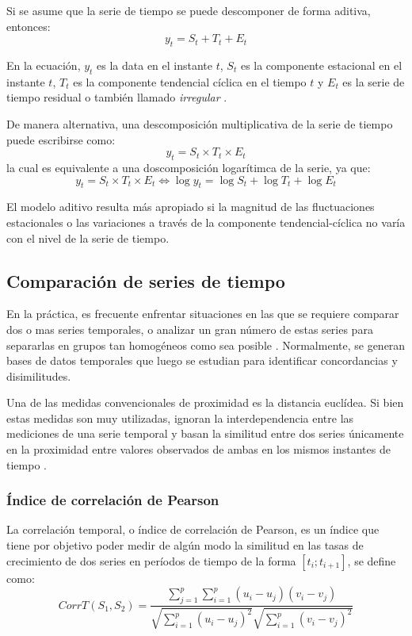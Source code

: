    Si se asume que la serie de tiempo se puede descomponer de forma aditiva, entonces:
    \begin{equation}
        y_t = S_t + T_t + E_t
     \end{equation}
        
     En la ecuación,  $y_t$ es la data en el instante $t$, $S_t$ es la componente estacional en el instante $t$, $T_t$ es la componente tendencial cíclica en el tiempo $t$
     y $E_t$ es la serie de tiempo residual o también llamado \textit{irregular} \cite{20}.

     De manera alternativa, una descomposición multiplicativa de la serie de tiempo puede escribirse como:
     \begin{equation}
        y_t = S_t 
        \times T_t 
        \times E_t
     \end{equation}
     la cual es equivalente a una doscomposición logarítimca de la serie, ya que:
     \begin{equation*}
        y_t = S_t 
        \times T_t 
        \times E_t
        \iff
        \log y_t =  \log S_t +
        \log T_t +
        \log E_t
     \end{equation*}

     El modelo aditivo resulta más apropiado si la magnitud de las fluctuaciones estacionales o las variaciones
     a través de la componente tendencial-cíclica no varía con el nivel de la serie de tiempo.


     \subsection{Comparación de series de tiempo}
     En la práctica, es frecuente enfrentar situaciones
     en las que se requiere comparar dos o mas series temporales, o analizar un gran
     número de estas series para separarlas en grupos tan homogéneos como sea posible \cite{27}.
     Normalmente, se generan bases de datos temporales que luego se estudian para identificar concordancias y disimilitudes.    

     Una de las medidas convencionales de proximidad es la distancia euclídea. Si bien estas medidas son muy utilizadas, ignoran la interdependencia entre
     las mediciones de una serie temporal y basan la similitud entre dos series únicamente en la proximidad entre valores observados de ambas en los mismos instantes de
     tiempo \cite{27}.
     \subsubsection{Índice de correlación de Pearson}
     La correlación temporal, o índice de correlación de Pearson, es un índice que tiene por objetivo poder medir de algún modo la similitud en las tasas de crecimiento de dos series en períodos de
     tiempo de la forma $[t_i; t_{i+1}]$, se define como:
     \begin{equation}\label{eqn:cort}
        CorrT(S_1,S_2) = \frac{\sum_{j=1}^p\sum_{i=1}^p(u_i-u_j)(v_i-v_j)} {\sqrt{\sum_{i=1}^p(u_i-u_j)^2}\sqrt{\sum_{i=1}^p(v_i-v_j)^2}}
     \end{equation}

